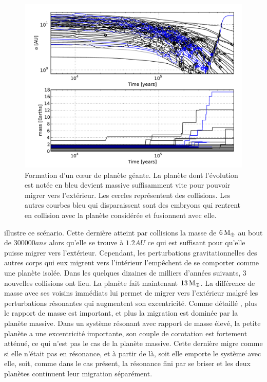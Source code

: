 \begin{figure}[htb]
\centering
\includegraphics[width=0.65\linewidth]{figure/HSE/single_outward.pdf}
\caption{Formation d'un cœur de planète géante. La planète dont l'évolution est notée en bleu devient massive suffisamment vite pour pouvoir migrer vers l'extérieur. Les cercles représentent des collisions. Les autres courbes bleu qui disparaissent sont des embryons qui rentrent en collision avec la planète considérée et fusionnent avec elle. }\label{fig:single_outward}%
\end{figure}

 illustre ce scénario. Cette dernière atteint par collisions la masse de $6\mathrm{\thinspace M_\oplus}$ au bout de $300 000\unit{ans}$ alors qu'elle se trouve à $1.2\unit{AU}$ ce qui est suffisant pour qu'elle puisse migrer vers l'extérieur. Cependant, les perturbations gravitationnelles des autres corps qui eux migrent vers l'intérieur l'empêchent de se comporter comme une planète isolée. Dans les quelques dizaines de milliers d'années suivants, 3 nouvelles collisions ont lieu. La planète fait maintenant $13\mathrm{\thinspace M_\oplus}$. La différence de masse avec ses voisins immédiats lui permet de migrer vers l'extérieur malgré les perturbations résonantes qui augmentent son excentricité. Comme détaillé , plus le rapport de masse est important, et plus la migration est dominée par la planète massive. Dans un système résonant avec rapport de masse élevé, la petite planète a une excentricité importante, son couple de corotation est fortement atténué, ce qui n'est pas le cas de la planète 
massive. Cette dernière migre comme si elle n'était pas en résonance, et à partir de là, soit elle emporte le système avec elle, soit, comme dans le cas présent, la résonance fini par se briser et les deux planètes continuent leur migration séparément.


